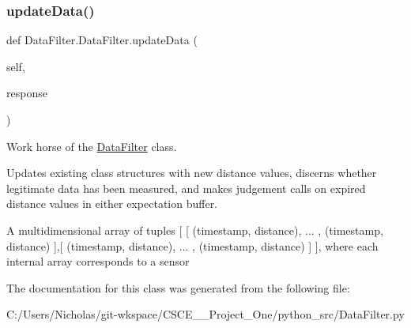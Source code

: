 \subsubsection{\texorpdfstring{update\+Data()}{updateData()}}
{\footnotesize\ttfamily def Data\+Filter.\+Data\+Filter.\+update\+Data (\begin{DoxyParamCaption}\item[{}]{self,  }\item[{}]{response }\end{DoxyParamCaption})}



Work horse of the \mbox{\hyperlink{class_data_filter_1_1_data_filter}{Data\+Filter}} class. 

Updates existing class structures with new distance values, discerns whether legitimate data has been measured, and makes judgement calls on expired distance values in either expectation buffer.

\begin{DoxyVerb}        A multidimensional array of tuples [ [ (timestamp, distance), ... , (timestamp, distance) ],[ (timestamp, distance), ... , (timestamp, distance) ] ], where each internal array corresponds to a sensor\end{DoxyVerb}
 

The documentation for this class was generated from the following file\+:\begin{DoxyCompactItemize}
\item 
C\+:/\+Users/\+Nicholas/git-\/wkspace/\+C\+S\+C\+E\+\_\+\_\+\+Project\+\_\+\+One/python\+\_\+src/Data\+Filter.\+py\end{DoxyCompactItemize}
